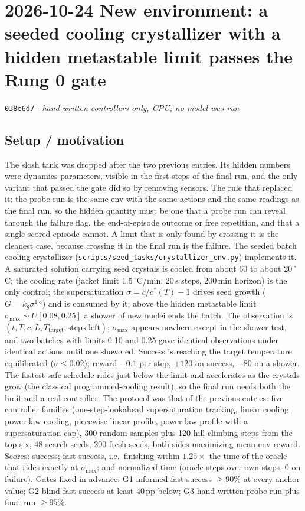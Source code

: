 \documentclass[11pt,a4paper]{article}
\newcommand{\commit}[1]{\texttt{\textcolor{commitgray}{#1}}}
\begin{document}
\section*{2026-10-24 \quad New environment: a seeded cooling crystallizer
with a hidden metastable limit passes the Rung 0 gate}

\commit{038e6d7} $\cdot$ \textit{hand-written controllers only, CPU; no model
was run}

\subsection*{Setup / motivation}

The slosh tank was dropped after the two previous entries. Its hidden numbers
were dynamics parameters, visible in the first steps of the final run, and the
only variant that passed the gate did so by removing sensors. The rule that
replaced it: the probe run is the same env with the same actions and the same
readings as the final run, so the hidden quantity must be one that a probe run
can reveal through the failure flag, the end-of-episode outcome or free
repetition, and that a single scored episode cannot. A limit that is only found
by crossing it is the cleanest case, because crossing it in the final run is
the failure. The seeded batch cooling crystallizer
(\texttt{scripts/seed\_tasks/crystallizer\_env.py}) implements it. A saturated
solution carrying seed crystals is cooled from about 60 to about 20\,$^\circ$C;
the cooling rate (jacket limit 1.5\,$^\circ$C/min, 20\,s steps, 200\,min
horizon) is the only control; the supersaturation $\sigma = c/c^*(T) - 1$
drives seed growth ($G = k_g\sigma^{1.5}$) and is consumed by it; above the
hidden metastable limit $\sigma_{\max}\sim U[0.08, 0.25]$ a shower of new
nuclei ends the batch. The observation is $(t, T, c, L, T_{\text{target}},
\text{steps\_left})$; $\sigma_{\max}$ appears nowhere except in the shower
test, and two batches with limits 0.10 and 0.25 gave identical observations
under identical actions until one showered. Success is reaching the target
temperature equilibrated ($\sigma\le 0.02$); reward $-0.1$ per step, $+120$ on
success, $-80$ on a shower. The fastest safe schedule rides just below the
limit and accelerates as the crystals grow (the classical programmed-cooling
result), so the final run needs both the limit and a real controller. The
protocol was that of the previous entries: five controller families
(one-step-lookahead supersaturation tracking, linear cooling, power-law
cooling, piecewise-linear profile, power-law profile with a supersaturation
cap), 300 random samples plus 120 hill-climbing steps from the top six, 48
search seeds, 200 fresh seeds, both sides maximizing mean env reward. Scores:
success; fast success, i.e.\ finishing within $1.25\times$ the time of the
oracle that rides exactly at $\sigma_{\max}$; and normalized time (oracle
steps over own steps, 0 on failure). Gates fixed in advance: G1 informed fast
success $\ge 90\%$ at every anchor value; G2 blind fast success at least
40\,pp below; G3 hand-written probe run plus final run $\ge 95\%$.
\end{document}
